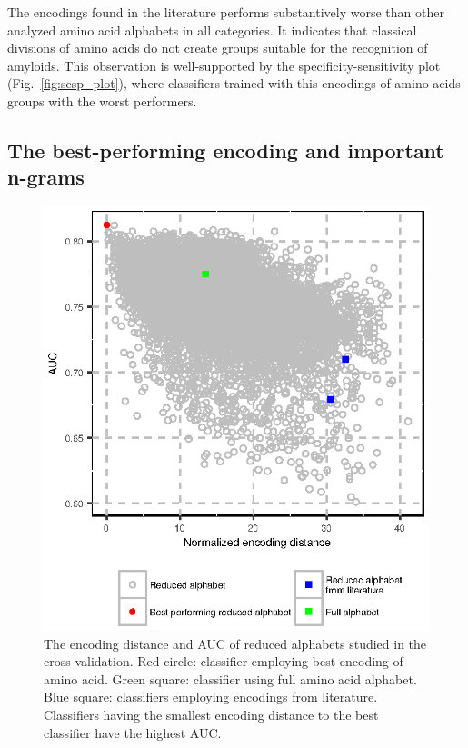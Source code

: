 \documentclass{bioinfo}
\begin{document}
  The encodings found in the literature performs substantively worse than other 
analyzed amino acid alphabets in all categories. It indicates that classical 
divisions of amino acids do not create groups suitable for the recognition of 
amyloids. This observation is well-supported by the specificity-sensitivity 
plot (Fig.~\ref{fig:sesp_plot}), where classifiers trained with this encodings 
of amino acids groups with the worst performers.

\subsection{The best-performing encoding and important n-grams}

\begin{figure}[!tpb]
\centerline{\includegraphics{figures/ed_AUC.eps}}
\caption{The encoding distance and AUC of reduced alphabets studied in the cross-validation. Red 
circle: classifier employing best encoding of amino acid. Green square: 
classifier using full amino acid alphabet. Blue square: classifiers employing 
encodings from literature. Classifiers having the smallest encoding distance to the best classifier have the highest AUC.}\label{fig:ed_AUC}
\end{figure}
\end{document}
